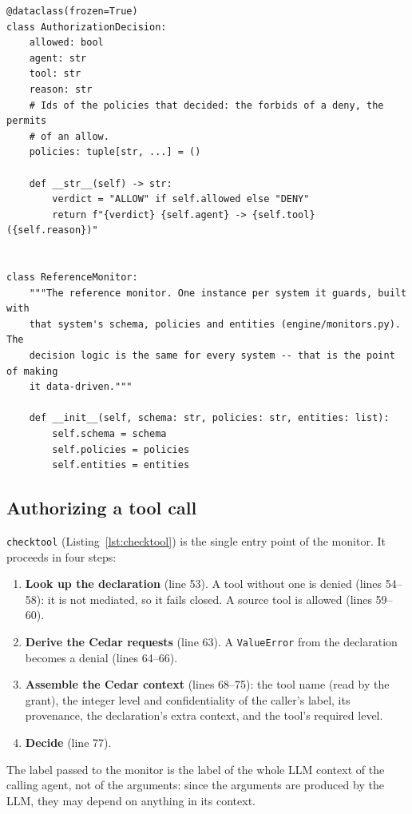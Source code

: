 \documentclass[11pt,a4paper]{article}
\DeclareRobustCommand{\code}[1]{{\renewcommand{\_}{\textunderscore\allowbreak}\texttt{#1}}}
\begin{document}
\begin{lstlisting}[firstnumber=11,style=py,caption={Decision record and monitor constructor (\texttt{engine/engine.py}, lines 11--35)},label={lst:decision}]
@dataclass(frozen=True)
class AuthorizationDecision:
    allowed: bool
    agent: str
    tool: str
    reason: str
    # Ids of the policies that decided: the forbids of a deny, the permits
    # of an allow.
    policies: tuple[str, ...] = ()

    def __str__(self) -> str:
        verdict = "ALLOW" if self.allowed else "DENY"
        return f"{verdict} {self.agent} -> {self.tool} ({self.reason})"


class ReferenceMonitor:
    """The reference monitor. One instance per system it guards, built with
    that system's schema, policies and entities (engine/monitors.py). The
    decision logic is the same for every system -- that is the point of making
    it data-driven."""

    def __init__(self, schema: str, policies: str, entities: list):
        self.schema = schema
        self.policies = policies
        self.entities = entities
\end{lstlisting}

\subsection{Authorizing a tool call}

\code{check\_tool} (Listing~\ref{lst:checktool}) is the single entry point of the monitor.
It proceeds in four steps:
\begin{enumerate}
  \item \textbf{Look up the declaration} (line 53). A tool without one is denied
        (lines 54--58): it is not mediated, so it fails closed. A source tool is allowed
        (lines 59--60).
  \item \textbf{Derive the Cedar requests} (line 63). A \code{ValueError} from the
        declaration becomes a denial (lines 64--66).
  \item \textbf{Assemble the Cedar context} (lines 68--75): the tool name (read by the
        grant), the integer level and confidentiality of the caller's label, its
        provenance, the declaration's extra context, and the tool's required level.
  \item \textbf{Decide} (line 77).
\end{enumerate}
The label passed to the monitor is the label of the whole LLM context of the calling
agent, not of the arguments: since the arguments are produced by the LLM, they may
depend on anything in its context.
\end{document}
